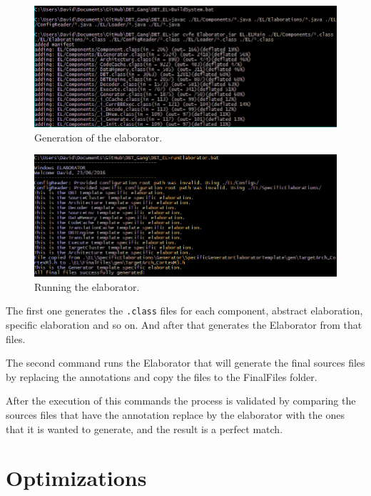 \documentclass[11pt]{report}
\begin{document}
	\begin{figure} [H]
		\centering
		\includegraphics[width=1\linewidth]{Images/script}
		\caption{Generation of the elaborator.}
		\label{fig:build}
	\end{figure}
	
	\begin{figure} [H]
		\centering
		\includegraphics[width=1\linewidth]{Images/scriptRunElaborator}
		\caption{Running the elaborator.}
		\label{fig:runElaborator}
	\end{figure}
	
	The first one generates the \texttt{.class} files for each component, abstract elaboration, specific elaboration and so on. And after that generates the Elaborator from that files.
	
	The second command runs the Elaborator that will generate the final sources files by replacing the annotations and copy the files to the FinalFiles folder.
	
	After the execution of this commands the process is validated by comparing the sources files that have the annotation replace by the elaborator with the ones that it is wanted to generate, and the result is a perfect match.
	
	
	\section{Optimizations}
	
\end{document}

